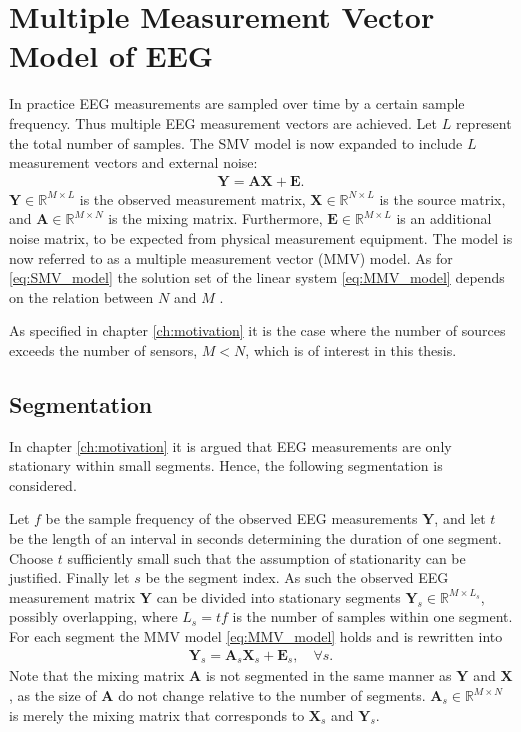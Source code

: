 \section{Multiple Measurement Vector Model of EEG}\label{sec:MMV}
In practice EEG measurements are sampled over time by a certain sample frequency. 
Thus multiple EEG measurement vectors are achieved.
Let $L$ represent the total number of samples. 
The SMV model is now expanded to include $L$ measurement vectors and external noise:
\begin{align}\label{eq:MMV_model}
\mathbf{Y} = \mathbf{AX}+\textbf{E}.
\end{align}
$\mathbf{Y} \in \mathbb{R}^{M \times L}$ is the observed measurement matrix, $\mathbf{X} \in \mathbb{R}^{N \times L}$ is the source matrix, and $\mathbf{A} \in \mathbb{R}^{M \times N}$ is the mixing matrix. 
Furthermore, $\mathbf{E} \in \mathbb{R}^{M \times L}$ is an additional noise matrix, to be expected from physical measurement equipment.  
The model is now referred to as a multiple measurement vector (MMV) model.
As for \eqref{eq:SMV_model} the solution set of the linear system \eqref{eq:MMV_model} depends on the relation between $N$ and $M$ \cite[p. 42]{CS}. 

As specified in chapter \ref{ch:motivation} it is the case where the number of sources exceeds the number of sensors, $M < N$, which is of interest in this thesis.  

\subsection{Segmentation}\label{seg_segmentation}
In chapter \ref{ch:motivation} it is argued that EEG measurements are only stationary within small segments. 
Hence, the following segmentation is considered.

Let $f$ be the sample frequency of the observed EEG measurements $\mathbf{Y}$, and let $t$ be the length of an interval in seconds determining the duration of one segment. Choose $t$ sufficiently small such that the assumption of stationarity can be justified.   
Finally let $s$ be the segment index. 
As such the observed EEG measurement matrix $\mathbf{Y}$ can be divided into stationary segments $\mathbf{Y}_s \in \mathbb{R}^{M \times L_{s}}$, possibly overlapping, where $L_s = t f$ is the number of samples within one segment.
For each segment the MMV model \eqref{eq:MMV_model} holds and is rewritten into
\begin{align}\label{eq:MMV_seg}
\mathbf{Y}_s = \textbf{A}_s\mathbf{X}_s + \textbf{E}_s, \quad \forall s.
\end{align}
Note that the mixing matrix $\mathbf{A}$ is not segmented in the same manner as $\mathbf{Y}$ and $\mathbf{X}$, as the size of $\mathbf{A}$ do not change relative to the number of segments. $\mathbf{A}_s\in \mathbb{R}^{M \times N}$ is merely the mixing matrix that corresponds to $\mathbf{X}_s$ and $\mathbf{Y}_s$.

